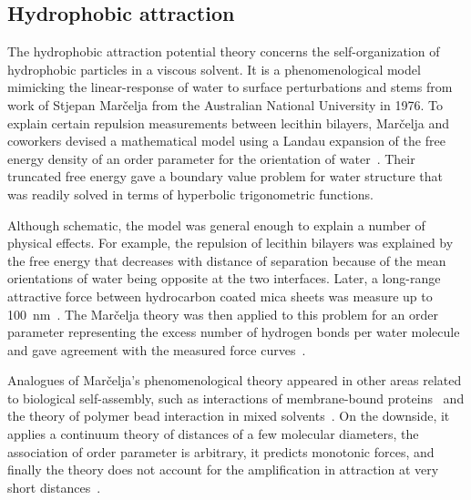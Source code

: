 \subsection{Hydrophobic attraction}
The hydrophobic attraction potential theory concerns the self-organization of
hydrophobic particles in a viscous solvent. It is a phenomenological
model mimicking the linear-response of water to surface perturbations
and stems from work of Stjepan Mar\v{c}elja
from the Australian National University in 1976. To explain certain
repulsion measurements between lecithin bilayers, Mar\v{c}elja and
coworkers devised a mathematical model using a Landau expansion of the
free energy density of an order parameter for the orientation of
water~\cite{LeRaPa77, MaRa76, LANDAULIFSHITZ5}. Their truncated free
energy gave a boundary value problem for water structure that was
readily solved in terms of hyperbolic trigonometric functions. 

Although schematic, the model was general enough to explain a number of
physical effects. For example, the repulsion of lecithin bilayers
was explained by the free energy that decreases with distance of
separation because of the mean orientations of water being opposite at
the two interfaces. Later, a long-range attractive force between
hydrocarbon coated mica sheets was measure up to
100~nm~\cite{ClCh88,RaDe88}. The Mar\v{c}elja
theory was then applied to this problem for an order parameter
representing the excess number of hydrogen bonds per water
molecule and gave agreement with the measured force
curves~\cite{ErLjCl89}.


Analogues of Mar\v{c}elja's phenomenological theory appeared in other
areas related to biological self-assembly, such as interactions of
membrane-bound proteins~\cite{KoNa15, Nagle17, KUZMIN2005} and the 
theory of polymer bead interaction in mixed
solvents~\cite{deGe76}.
On the downside, it applies a continuum theory of distances of a few
molecular diameters, the association of order parameter is arbitrary, it
predicts monotonic forces, and finally the theory does not account
for the amplification in attraction at very short distances~\cite{Ni80}.

